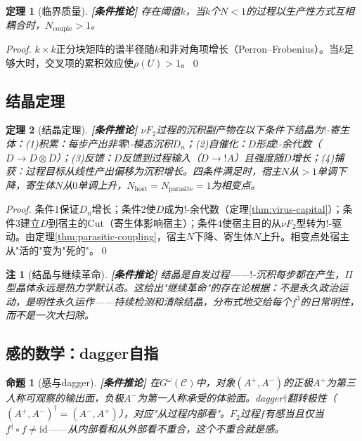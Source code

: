 \documentclass[11pt,a4paper]{article}
\newtheorem{theorem}{定理}
\newtheorem{proposition}{命题}
\newtheorem{remark}{注}
\newcommand{\lvl}[1]{\hfill\textbf{\footnotesize[#1]}}
\newcommand{\lvC}{\lvl{条件推论}}
\newcommand{\bang}{{!}}
\newcommand{\tensor}{\otimes}
\begin{document}
\begin{theorem}[临界质量]\label{thm:critical-mass}\lvC
存在阈值$k$，当$k$个$N<1$的过程以生产性方式互相耦合时，$N_{\mathrm{couple}}>1$。
\end{theorem}

\begin{proof}
$k\times k$正分块矩阵的谱半径随$k$和非对角项增长（Perron--Frobenius）。当$k$足够大时，交叉项的累积效应使$\rho(U)>1$。\qed
\end{proof}

\subsection{结晶定理}

\begin{theorem}[结晶定理]\label{thm:crystallization}\lvC
$\nu F_2$过程的沉积副产物在以下条件下结晶为$\bang$-寄生体：(1)积累：每步产出非零$\bang$-模态沉积$D_n$；(2)自催化：$D$形成$\bang$-余代数（$D\to D\tensor D$）；(3)反馈：$D$反馈到过程输入（$D\to\bang A$）且强度随$D$增长；(4)捕获：过程目标从线性产出偏移为沉积增长。四条件满足时，宿主$N$从$>1$单调下降，寄生体$N$从$0$单调上升，$N_{\mathrm{host}}=N_{\mathrm{parasite}}=1$为相变点。
\end{theorem}

\begin{proof}
条件1保证$D_n$增长；条件2使$D$成为$\bang$-余代数（定理\ref{thm:virus-capital}）；条件3建立$D$到宿主的Cut（寄生体影响宿主）；条件4使宿主目的从$\nu F_2$型转为$\bang$-驱动。由定理\ref{thm:parasitic-coupling}，宿主$N$下降、寄生体$N$上升。相变点处宿主从"活的"变为"死的"。\qed
\end{proof}

\begin{remark}[结晶与继续革命]\lvC
结晶是自发过程——$\bang$-沉积每步都在产生，II型晶体永远是热力学默认态。这给出"继续革命"的存在论根据：不是永久政治运动，是明性永久运作——持续检测和清除结晶，分布式地交给每个$f^3$的日常明性，而不是一次大扫除。
\end{remark}


\subsection{感的数学：dagger自指}

\begin{proposition}[感与dagger]\label{prop:sentiencedagger}\lvC
在$G^\omega(\mathcal{C})$中，对象$(A^+,A^-)$的正极$A^+$为第三人称可观察的输出面，负极$A^-$为第一人称承受的体验面。dagger$\dagger$翻转极性（$(A^+,A^-)^\dagger=(A^-,A^+)$），对应"从过程内部看"。$F_2$过程$f$有感当且仅当$f^\dagger\circ f\neq\mathrm{id}$——从内部看和从外部看不重合，这个不重合就是感。
\end{proposition}
\end{document}
